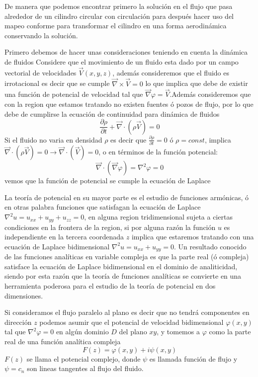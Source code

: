 \documentclass[12pt]{article}
\begin{document}
	\noindent De manera que podemos encontrar primero la solución en el flujo que pasa alrededor de  un cilindro circular con circulación para después hacer uso del mapeo conforme para transformar el cilindro en una forma aerodinámica conservando la solución.	
	
	\noindent Primero debemos de hacer unas consideraciones teniendo en cuenta la dinámica de fluidos Considere que el movimiento de un fluido esta dado por un campo vectorial de velocidades $\vec{V}(x,y,z)$, además consideremos que el fluido es irrotacional es decir que se cumple $\vec{\nabla} \times \vec{V}=0 $ lo que implica que debe de existir una función de potencial de velocidad tal que $\vec{\nabla}\varphi = \vec{V}$.Además consideremos que con la region que estamos tratando no existen fuentes ó pozos de flujo, por lo que debe de cumplirse la ecuación de continuidad para dinámica de fluidos
	\begin{equation}
		\frac{\partial \rho}{\partial t} + \vec{\nabla} \cdotp (\rho \vec{V}) =0		
	\end{equation}
	Si el fluido no varia en densidad $\rho$ es decir que $\frac{\partial \rho}{\partial t} =0 $ ó $\rho = const$, implica $\vec{\nabla} \cdotp (\rho \vec{V}) = 0 \longrightarrow \vec{\nabla} \cdotp (\vec{V}) =0 $, o en términos de la función potencial:
	\begin{equation}
		\vec{\nabla} \cdotp (\vec{\nabla}\varphi) = \nabla^2 \varphi =0 
	\end{equation}	 
	vemos que la función de potencial se cumple la ecuación de Laplace 
	
	\noindent La teoría de potencial	en su mayor parte es el estudio de funciones armónicas, ó en otras palabra funciones que satisfagan la ecuación de Laplace $\nabla^2u = u_{xx} + u_{yy} + u_{zz}= 0 $, en alguna region tridimensional sujeta a ciertas condiciones en la frontera de la region, si por alguna razón la función $u$ es independiente en la tercera coordenada $z$ implica que estaremos tratando con una ecuación de Laplace bidimensional $\nabla^2u = u_{xx} + u_{yy} =0$. Un resultado conocido de las funciones analíticas en variable compleja es que la parte real (ó compleja) satisface la ecuación de Laplace bidimensional en el dominio de analiticidad, siendo por esta razón que la teoría de funciones analíticas se convierte en una herramienta poderosa para el estudio de la teoría de potencial en dos dimensiones.    

	\noindent Si consideramos el flujo paralelo al plano es decir que no tendrá componentes en dirección $z$ podemos asumir que el potencial de velocidad bidimensional  $\varphi(x,y)$ tal que $\nabla^2 \varphi =0 $ en algún dominio $D$ del plano $xy$, y tomemos a $\varphi$ como la parte real de una función analítica compleja
	\begin{equation}
		F(z)=\varphi (x,y)	+ i \psi(x,y)	
	\end{equation}
	$F(z)$ se llama el potencial complejo, donde $\psi$ es llamada  función de flujo y $\psi = c_n$ son lineas tangentes al flujo del fluido.
	
\end{document}
